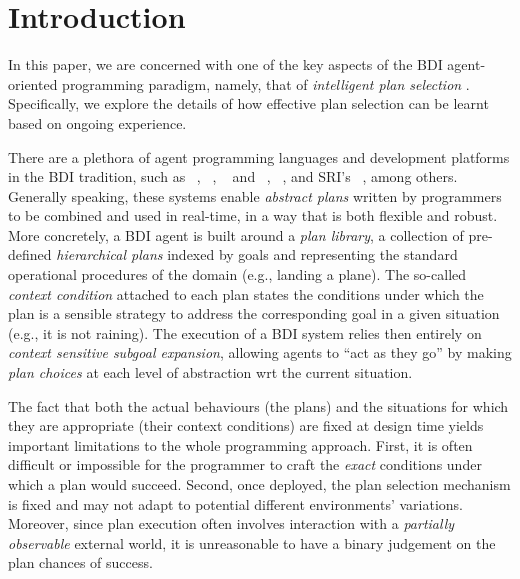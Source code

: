 \section{Introduction}\label{sec:intro}

In this paper, we are concerned with one of the key aspects of the BDI
agent-oriented programming paradigm, namely, that of \emph{intelligent plan
selection} \cite{Pollack92-IRMA,Georgeff89-PRS}.
Specifically, we explore the details of how effective plan selection can be
learnt based on ongoing experience.


There are a plethora of agent programming languages and development platforms in
the BDI tradition, such as  \PRS\ \cite{Georgeff89-PRS}, \JACK~\cite{BRHL98},
\TAPL~\cite{Hindriks99:Agent} and \DAPL~\cite{Dastani:JAAMAS08-2APL},
\JASON~\cite{jasonbook}, and SRI's \SPARK~\cite{MorelyM:AAMAS04-SPARK}, among
others. %
Generally speaking, these systems enable \emph{abstract plans} written by
programmers to be combined and used in real-time, in a way that is both flexible
and robust. More concretely, a BDI agent is built around a
\textit{plan library}, a collection of pre-defined \textit{hierarchical plans}
indexed by goals and representing the standard operational procedures of the
domain (e.g., landing a plane).
The so-called \emph{context condition} attached to each plan states the
conditions under which the plan is a sensible strategy to address the
corresponding goal in a given situation (e.g., it is not raining). The execution
of a BDI system relies then entirely on \textit{context sensitive subgoal
expansion}, allowing agents to ``act as they go'' by making \emph{plan
choices} at each level of abstraction wrt the current situation.



The fact that both the actual behaviours (the plans) and the situations for which
they are appropriate (their context conditions) are fixed at design time yields
important limitations to the whole programming approach.
First, it is often difficult or impossible for the programmer to craft the
\emph{exact} conditions under which a plan would succeed. Second, once deployed,
the plan selection mechanism is fixed and may not adapt to potential different
environments' variations.
Moreover, since plan execution often involves interaction with a \emph{partially
observable} external world, it is unreasonable to have a binary judgement on the
plan chances of success.


